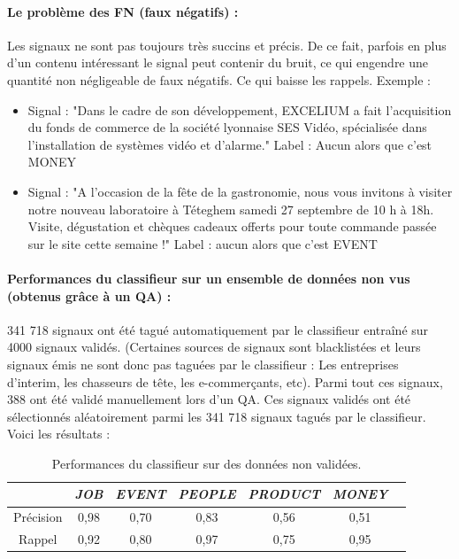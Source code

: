                 \paragraph{Le problème des FN (faux négatifs) :}
                    Les signaux ne sont pas toujours très succins et précis. De ce fait, parfois en plus d'un contenu intéressant le signal peut contenir du bruit, ce qui engendre une quantité non négligeable de faux négatifs. Ce qui baisse les rappels. Exemple :
                    \begin{itemize}
                        \item Signal : "Dans le cadre de son développement, EXCELIUM a fait l'acquisition du fonds de commerce de la société lyonnaise SES Vidéo, spécialisée dans l'installation de systèmes vidéo et d'alarme." Label : Aucun alors que c'est MONEY
                        \item Signal : "A l'occasion de la fête de la gastronomie, nous vous invitons à visiter notre nouveau laboratoire à Téteghem samedi 27 septembre de 10 h à 18h. Visite, dégustation et chèques cadeaux offerts pour toute commande passée sur le site cette semaine !" Label : aucun alors que c'est EVENT
                    \end{itemize}

                \paragraph{Performances du classifieur sur un ensemble de données non vus (obtenus grâce à un QA) :}
                    341 718 signaux ont été tagué automatiquement par le classifieur entraîné sur 4000 signaux validés.
                    (Certaines sources de signaux sont blacklistées et leurs signaux émis ne sont donc pas taguées par le classifieur : Les entreprises d'interim, les chasseurs de tête, les e-commerçants, etc). Parmi tout ces signaux, 388 ont été validé manuellement lors d'un QA. Ces signaux validés ont été sélectionnés aléatoirement parmi les 341 718 signaux tagués par le classifieur. Voici les résultats :
                    \begin{table}[t]
                        \centering
                        \begin{tabular}{| c | c | c | c | c | c | c |}
                            \hline
                             & \textit{JOB} & \textit{EVENT} & \textit{PEOPLE} & \textit{PRODUCT} & \textit{MONEY} \\
                            \hline
                            Précision & 0,98 & 0,70 & 0,83 & 0,56 & 0,51 \\
                            Rappel & 0,92 & 0,80 & 0,97 & 0,75 & 0,95 \\
                            \hline
                        \end{tabular}
                        \caption{Performances du classifieur sur des données non validées.}
                        \label{tab:classif_perf4}
                    \end{table}

